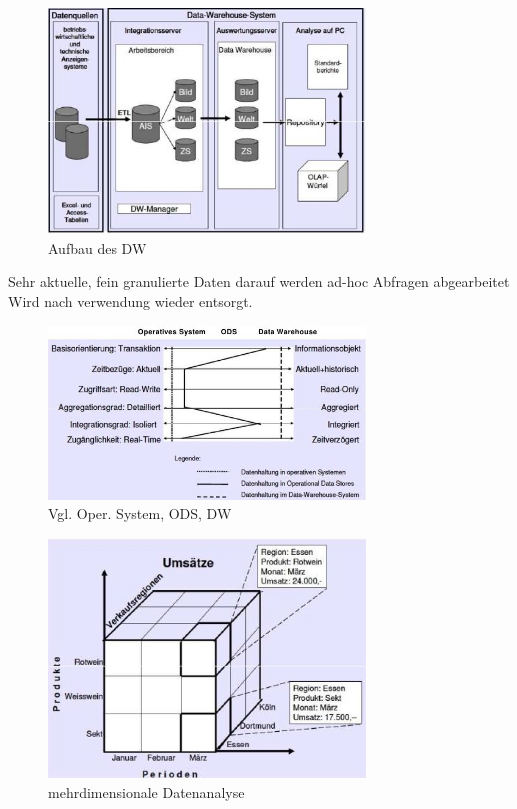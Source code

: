 \documentclass[ngerman,a4paper,12pt]{scrreprt}
\begin{document}
\begin{figure}[H]
	\centering
	\includegraphics[width=0.75\textwidth]{img/V6.9.jpg}
	\caption{Aufbau des DW}
	\label{}
\end{figure}

\ul
	\li Sehr aktuelle, fein granulierte Daten
	\li darauf werden ad-hoc Abfragen abgearbeitet
	\li Wird nach verwendung wieder entsorgt.
\ulE
\begin{figure}[H]
	\centering
	\includegraphics[width=0.75\textwidth]{img/V6.8.jpg}
	\caption{Vgl. Oper. System, ODS, DW}
	\label{}
\end{figure}
				
				
\begin{figure}[H]
	\centering
	\includegraphics[width=0.75\textwidth]{img/V6.10.jpg}
	\caption{mehrdimensionale Datenanalyse}
	\label{}
\end{figure}	
				
\end{document}
